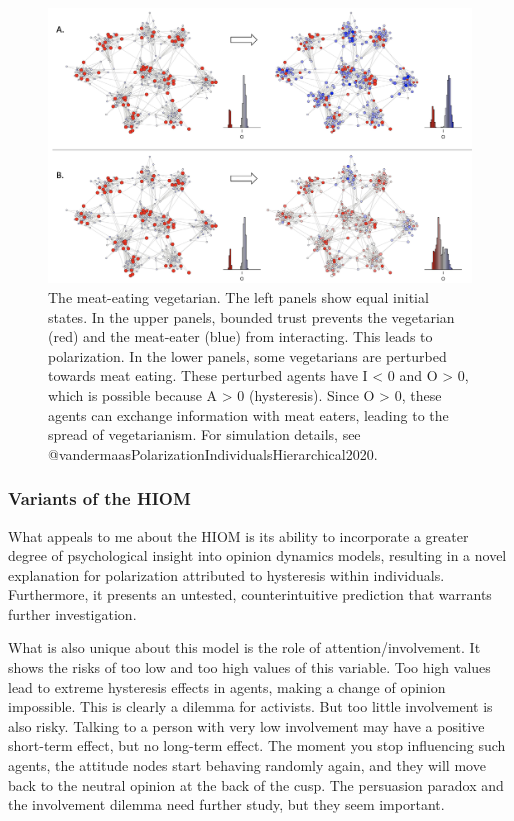 \documentclass[
  letterpaper,
]{scrbook}
\begin{document}
\begin{figure}

{\centering \includegraphics[width=6.26389in,height=\textheight]{media/ch7/image12.jpg}

}

\caption{\label{fig-ch7-img12-old-100}The meat-eating vegetarian. The
left panels show equal initial states. In the upper panels, bounded
trust prevents the vegetarian (red) and the meat-eater (blue) from
interacting. This leads to polarization. In the lower panels, some
vegetarians are perturbed towards meat eating. These perturbed agents
have I \textless{} 0 and O \textgreater{} 0, which is possible because A
\textgreater{} 0 (hysteresis). Since O \textgreater{} 0, these agents
can exchange information with meat eaters, leading to the spread of
vegetarianism. For simulation details, see
@vandermaasPolarizationIndividualsHierarchical2020.}

\end{figure}

\hypertarget{variants-of-the-hiom}{%
\subsubsection{Variants of the HIOM}\label{variants-of-the-hiom}}

What appeals to me about the HIOM is its ability to incorporate a
greater degree of psychological insight into opinion dynamics models,
resulting in a novel explanation for polarization attributed to
hysteresis within individuals. Furthermore, it presents an untested,
counterintuitive prediction that warrants further investigation.

What is also unique about this model is the role of
attention/involvement. It shows the risks of too low and too high values
of this variable. Too high values lead to extreme hysteresis effects in
agents, making a change of opinion impossible. This is clearly a dilemma
for activists. But too little involvement is also risky. Talking to a
person with very low involvement may have a positive short-term effect,
but no long-term effect. The moment you stop influencing such agents,
the attitude nodes start behaving randomly again, and they will move
back to the neutral opinion at the back of the cusp. The persuasion
paradox and the involvement dilemma need further study, but they seem
important.
\end{document}
